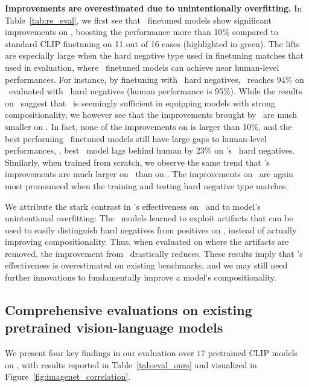 \textbf{Improvements are overestimated due to unintentionally overfitting.}
In Table~\ref{tab:re_eval}, we first see that \negclip\ finetuned models show significant improvements on \hncoco, boosting the performance more than 10\% compared to standard CLIP finetuning on 11 out of 16 cases (highlighted in green). The lifts are especially large when the hard negative type used in finetuning matches that used in evaluation, where \negclip\ finetuned models can achieve near human-level performances. For instance, by finetuning with \replace\ hard negatives, \negclip\ reaches 94\% on \hncoco\ evaluated with \replace\ hard negatives (human performance is 95\%).
While the results on \hncoco\ suggest that \negclip\ is seemingly sufficient in equipping models with strong compositionality, we however see that the improvements brought by \negclip\ are much smaller on \method. In fact, none of the improvements on \method is larger than 10\%, and the best performing \negclip\ finetuned models still have large gaps to human-level performances, \eg, best \negclip\ model lags behind human by 23\% on \method's \swap\ hard negatives.
Similarly, when trained from scratch, we observe the same trend that \negclip's improvements are much larger on \hncoco\ than on \method. The improvements on \hncoco\ are again most pronounced when the training and testing hard negative type matches.

We attribute the stark contrast in \negclip's effectiveness on \hncoco\ and \method to model's unintentional overfitting: The \negclip\ models learned to exploit artifacts that can be used to easily distinguish hard negatives from positives on \hncoco, instead of actually improving compositionality.
Thus, when evaluated on \method where the artifacts are removed, the improvement from \negclip\ drastically reduces.
These results imply that \negclip's effectiveness is overestimated on existing benchmarks, and we may still need further innovations to fundamentally improve a model's compositionality.






\subsection{Comprehensive evaluations on existing pretrained vision-language models}
\label{sec:exp-eval}

We present four key findings in our evaluation over $17$ pretrained CLIP models on \method, with results reported in Table~\ref{tab:eval_ours} and visualized in Figure~\ref{fig:imagenet_correlation}.

